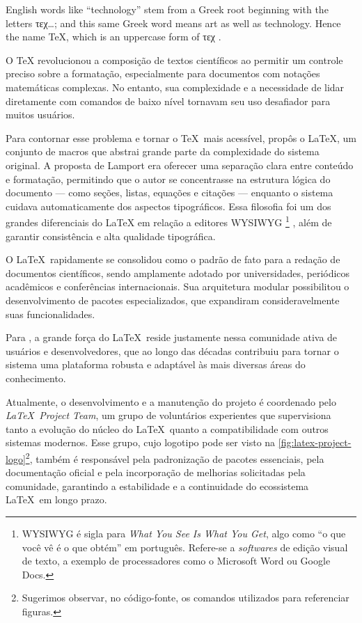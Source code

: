 \begin{citacao}[english]
English words like ``technology'' stem from a Greek root beginning with the letters \foreignlanguage{greek}{τεχ}\ldots; and this same Greek word means art as well as technology. Hence the name \TeX, which is an uppercase form of \foreignlanguage{greek}{τεχ} \cite{Knuth1984}.
\end{citacao}

O \TeX{} revolucionou a composição de textos científicos ao permitir um controle preciso sobre a formatação, especialmente para documentos com notações matemáticas complexas. No entanto, sua complexidade e a necessidade de lidar diretamente com comandos de baixo nível tornavam seu uso desafiador para muitos usuários.

Para contornar esse problema e tornar o \TeX\ mais acessível, \textcite{Lamport1994} propôs o \LaTeX, um conjunto de macros que abstrai grande parte da complexidade do sistema original. A proposta de Lamport era oferecer uma separação clara entre conteúdo e formatação, permitindo que o autor se concentrasse na estrutura lógica do documento --- como seções, listas, equações e citações --- enquanto o sistema cuidava automaticamente dos aspectos tipográficos. Essa filosofia foi um dos grandes diferenciais do \LaTeX{} em relação a editores WYSIWYG%
\footnote{WYSIWYG é sigla para \emph{\foreignlanguage{english}{What You See Is What You Get}}, algo como ``o que você vê é o que obtém'' em português. Refere-se a \emph{softwares} de edição visual de texto, a exemplo de processadores como o Microsoft Word ou Google Docs.}%
, além de garantir consistência e alta qualidade tipográfica.

O \LaTeX\ rapidamente se consolidou como o padrão de fato para a redação de documentos científicos, sendo amplamente adotado por universidades, periódicos acadêmicos e conferências internacionais. Sua arquitetura modular possibilitou o desenvolvimento de pacotes especializados, que expandiram consideravelmente suas funcionalidades.

Para \textcite{Mittelbach2004}, a grande força do \LaTeX\ reside justamente nessa comunidade ativa de usuários e desenvolvedores, que ao longo das décadas contribuiu para tornar o sistema uma plataforma robusta e adaptável às mais diversas áreas do conhecimento.

Atualmente, o desenvolvimento e a manutenção do projeto é coordenado pelo \textit{\LaTeX\ Project Team}, um grupo de voluntários experientes que supervisiona tanto a evolução do núcleo do \LaTeX\ quanto a compatibilidade com outros sistemas modernos. Esse grupo, cujo logotipo pode ser visto na \autoref{fig:latex-project-logo}\footnote{Sugerimos observar, no código-fonte, os comandos utilizados para referenciar figuras.}, também é responsável pela padronização de pacotes essenciais, pela documentação oficial e pela incorporação de melhorias solicitadas pela comunidade, garantindo a estabilidade e a continuidade do ecossistema \LaTeX\ em longo prazo.

